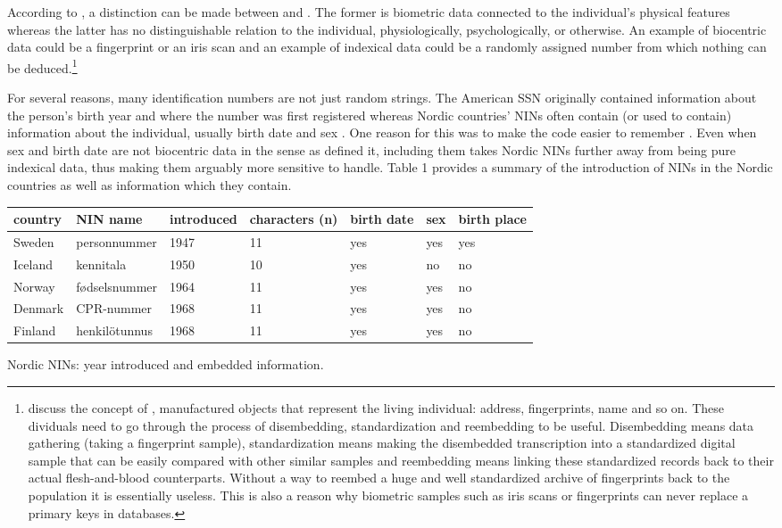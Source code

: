 According to \citet{Alterman2003}, a distinction can be made between  and . The former is biometric data connected to the individual's physical features whereas the latter has no distinguishable relation to the individual, physiologically, psychologically, or otherwise. An example of biocentric data could be a fingerprint or an iris scan and an example of indexical data could be a randomly assigned number from which nothing can be deduced.\footnote{\citet{brensinger2021} discuss the concept of , manufactured objects that represent the living individual: address, fingerprints, name and so on. These dividuals need to go through the process of disembedding, standardization and reembedding to be useful. Disembedding means data gathering (taking a fingerprint sample), standardization means making the disembedded transcription into a standardized digital sample that can be easily compared with other similar samples and reembedding means linking these standardized records back to their actual flesh-and-blood counterparts. Without a way to reembed a huge and well standardized archive of fingerprints back to the population it is essentially useless. This is also a reason why biometric samples such as iris scans or fingerprints can never replace a primary keys in databases.}

For several reasons, many identification numbers are not just random strings. The American SSN originally contained information about the person's birth year and where the number was first registered \citep[32]{brensinger2021} whereas Nordic countries' NINs often contain (or used to contain) information about the individual, usually birth date and sex \citep{watson2010, salste2021}. One reason for this was to make the code easier to remember \citep{alastalo2022}. Even when sex and birth date are not biocentric data in the sense as \citep{Alterman2003} defined it, including them takes Nordic NINs further away from being pure indexical data, thus making them arguably more sensitive to handle. Table 1 provides a summary of the introduction of NINs in the Nordic countries as well as information which they contain.

\begin{widetable}[ht]
\centering
\begin{tabular}{lllllll}
\toprule
  country & NIN name & introduced & characters (n) & birth date & sex & birth place \\
  \hline
  Sweden & personnummer & 1947 & 11 & yes & yes & yes\\
  Iceland & kennitala & 1950 & 10 & yes & no & no \\
  Norway & fødselsnummer & 1964 & 11 & yes & yes & no \\
  Denmark & CPR-nummer & 1968 & 11 & yes & yes & no \\
  Finland & henkilötunnus & 1968 & 11 & yes & yes & no \\
\bottomrule
\end{tabular}
\caption{Nordic NINs: year introduced and embedded information.}
\label{tab:nordiccomparison}
\end{widetable}

